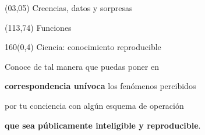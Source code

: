 \documentclass[shownotes,aspectratio=169]{beamer}
\begin{document}
\color{black!85}
\large

 

\begin{frame}
 
 \begin{textblock}{90}(03,05)
 \centering \huge  \textcolor{black!40}{Creencias, datos y sorpresas}
\end{textblock}

 \begin{textblock}{47}(113,74)
\centering \Large  \textcolor{white!55}{Funciones}
\end{textblock}

{}
\end{frame}

\begin{frame}[plain]
\begin{textblock}{160}(0,4)
 \centering \LARGE Ciencia: conocimiento reproducible
\end{textblock}
\vspace{0.75cm}

 \begin{mdframed}[backgroundcolor=black!20]
 \centering
  Conoce de tal manera que puedas poner en
  
\textbf{correspondencia un\'ivoca} los fenómenos percibidos

por tu conciencia con algún esquema de operación

\textbf{que sea públicamente inteligible y reproducible}.
 \end{mdframed}

\end{frame}
\end{document}
